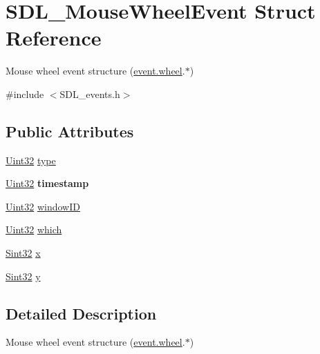 \hypertarget{struct_s_d_l___mouse_wheel_event}{}\section{S\+D\+L\+\_\+\+Mouse\+Wheel\+Event Struct Reference}
\label{struct_s_d_l___mouse_wheel_event}


Mouse wheel event structure (\hyperlink{union_s_d_l___event_a267d3f550715519ec90a81ccd0e6cbda}{event.\+wheel}.$\ast$)  




{\ttfamily \#include $<$S\+D\+L\+\_\+events.\+h$>$}

\subsection*{Public Attributes}
\begin{DoxyCompactItemize}
\item 
\hyperlink{_s_d_l__stdinc_8h_add440eff171ea5f55cb00c4a9ab8672d}{Uint32} \hyperlink{struct_s_d_l___mouse_wheel_event_aa6b741e99df708c6f9550ee0f520fb70}{type}
\item 
\hypertarget{struct_s_d_l___mouse_wheel_event_a83ad52c80ff49a8e75dc6c33bba65fa0}{}\hyperlink{_s_d_l__stdinc_8h_add440eff171ea5f55cb00c4a9ab8672d}{Uint32} {\bfseries timestamp}\label{struct_s_d_l___mouse_wheel_event_a83ad52c80ff49a8e75dc6c33bba65fa0}

\item 
\hyperlink{_s_d_l__stdinc_8h_add440eff171ea5f55cb00c4a9ab8672d}{Uint32} \hyperlink{struct_s_d_l___mouse_wheel_event_ab45eb1895217214ecb773fc555e08f6c}{window\+I\+D}
\item 
\hyperlink{_s_d_l__stdinc_8h_add440eff171ea5f55cb00c4a9ab8672d}{Uint32} \hyperlink{struct_s_d_l___mouse_wheel_event_a014dc767d52e8b75ba26a5f12e1704e8}{which}
\item 
\hyperlink{_s_d_l__stdinc_8h_a7a90b941db9d4582e9ad7abb9940ff7e}{Sint32} \hyperlink{struct_s_d_l___mouse_wheel_event_a6d904eef474ea45a5b1828fcb5b0f859}{x}
\item 
\hyperlink{_s_d_l__stdinc_8h_a7a90b941db9d4582e9ad7abb9940ff7e}{Sint32} \hyperlink{struct_s_d_l___mouse_wheel_event_a53fdf77a464426bc8b30e629795f044b}{y}
\end{DoxyCompactItemize}


\subsection{Detailed Description}
Mouse wheel event structure (\hyperlink{union_s_d_l___event_a267d3f550715519ec90a81ccd0e6cbda}{event.\+wheel}.$\ast$) 

